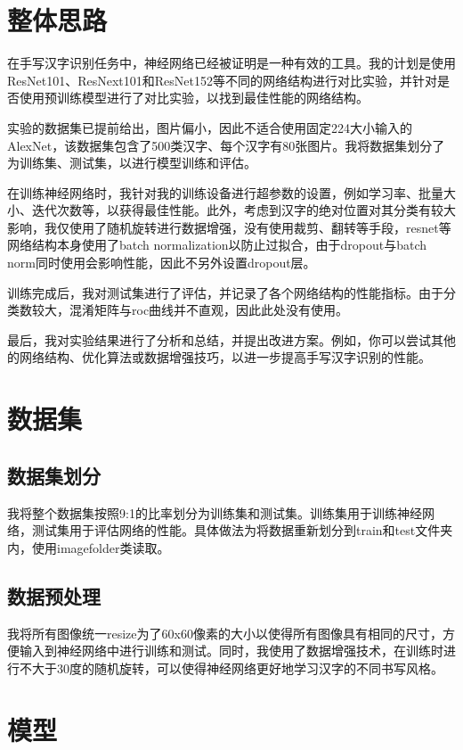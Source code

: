 \documentclass[10.5pt,a4paper]{article}%
\begin{document}
        \section{整体思路}
        在手写汉字识别任务中，神经网络已经被证明是一种有效的工具。我的计划是使用ResNet101、ResNext101和ResNet152等不同的网络结构进行对比实验，并针对是否使用预训练模型进行了对比实验，以找到最佳性能的网络结构。\par
        实验的数据集已提前给出，图片偏小，因此不适合使用固定224大小输入的AlexNet，该数据集包含了500类汉字、每个汉字有80张图片。我将数据集划分了为训练集、测试集，以进行模型训练和评估。\par
        在训练神经网络时，我针对我的训练设备进行超参数的设置，例如学习率、批量大小、迭代次数等，以获得最佳性能。此外，考虑到汉字的绝对位置对其分类有较大影响，我仅使用了随机旋转进行数据增强，没有使用裁剪、翻转等手段，resnet等网络结构本身使用了batch normalization\cite{batchnorm}以防止过拟合，由于dropout\cite{dropout}与batch norm同时使用会影响性能，因此不另外设置dropout层。\par
        训练完成后，我对测试集进行了评估，并记录了各个网络结构的性能指标。由于分类数较大，混淆矩阵与roc曲线并不直观，因此此处没有使用。\par
        最后，我对实验结果进行了分析和总结，并提出改进方案。例如，你可以尝试其他的网络结构、优化算法或数据增强技巧，以进一步提高手写汉字识别的性能。
        \section{数据集}
        \subsection{数据集划分}
        我将整个数据集按照9:1的比率划分为训练集和测试集。训练集用于训练神经网络，测试集用于评估网络的性能。具体做法为将数据重新划分到train和test文件夹内，使用imagefolder类读取。
        \subsection{数据预处理}
        我将所有图像统一resize为了60x60像素的大小以使得所有图像具有相同的尺寸，方便输入到神经网络中进行训练和测试。同时，我使用了数据增强技术，在训练时进行不大于30度的随机旋转，可以使得神经网络更好地学习汉字的不同书写风格。
        \section{模型}
\end{document}
